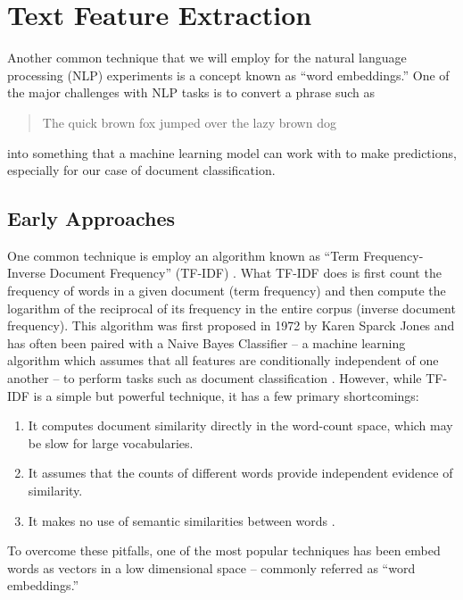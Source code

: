 \documentclass[../thesis.tex]{subfiles}
\begin{document}
\section{Text Feature Extraction}
Another common technique that we will employ for the natural language processing
(NLP) experiments is a concept known as ``word embeddings.'' One of the major
challenges with NLP tasks is to convert a phrase such as
\begin{quote}
    The quick brown fox jumped over the lazy brown dog
\end{quote}
into something that a machine learning model can work with to make predictions,
especially for our case of document classification.

\subsection{Early Approaches}
One common technique is employ an algorithm known as ``Term Frequency-Inverse
Document Frequency'' (TF-IDF) \cite{sparck1972statistical}. What TF-IDF does is
first count the frequency of words in a given document (term frequency) and then
compute the logarithm of the reciprocal of its frequency in the entire corpus
(inverse document frequency). This algorithm was first proposed in 1972 by Karen
Sparck Jones and has often been paired with a Naive Bayes Classifier -- a
machine learning algorithm which assumes that all features are conditionally
independent of one another -- to perform tasks such as document classification
\cite{kibriya2004multinomial}. However, while TF-IDF is a simple but powerful
technique, it has a few primary shortcomings:
\begin{enumerate}
    \item It computes document similarity directly in the word-count space,
    which may be slow for large vocabularies.
    \item It assumes that the counts of different words provide independent
    evidence of similarity.
    \item It makes no use of semantic similarities between words
    \cite{tfidf_lecture}.
\end{enumerate}
To overcome these pitfalls, one of the most popular techniques has been embed
words as vectors in a low dimensional space -- commonly referred as ``word
embeddings.''
\end{document}
